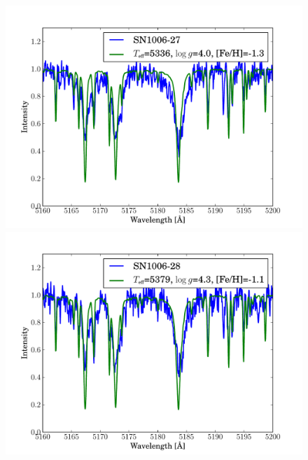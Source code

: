 \begin{figure}[tb]
   \label{fig:sn1006_candfit}
\end{figure}\begin{figure}[tb] %
   \centering
\includegraphics[width=1.1\textwidth, trim=0 0mm 0 10mm, clip]{chapter_sn1006/plots/gold_spectra/sn1006_27.pdf}
\includegraphics[width=1.1\textwidth, trim=0 0mm 0 10mm, clip]{chapter_sn1006/plots/gold_spectra/sn1006_28.pdf}

   \label{fig:sn1006_candfit}
\end{figure}